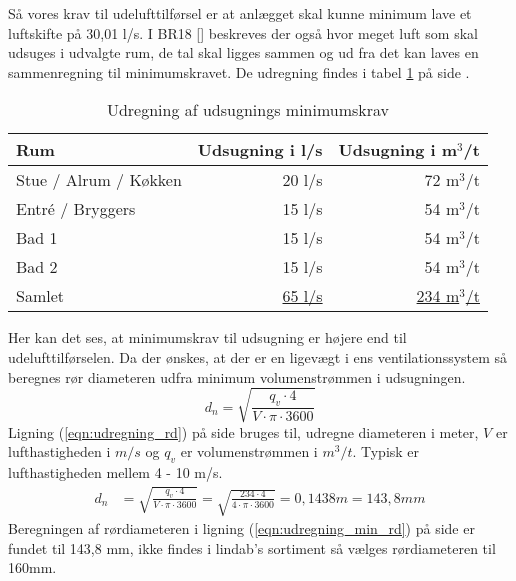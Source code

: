 Så vores krav til udelufttilførsel er at anlægget skal kunne minimum lave et luftskifte på 30,01 l/s.
I BR18 [\cite{BR18:Online}] beskreves der også hvor meget luft som skal udsuges i udvalgte rum, 
de tal skal ligges sammen og ud fra det kan laves en sammenregning til minimumskravet. De udregning findes i tabel \ref{table:samregn_vent_ud} på side \pageref{table:samregn_vent_ud}.
\begin{table}[h!]
    \begin{center}
       \begin{tabular}{|l|r|r|}
           \hline
           Rum & Udsugning i l/s & Udsugning i m$^3$/t \\
           \hline
           Stue / Alrum / Køkken & 20 l/s & 72 m$^3$/t\\
           Entré / Bryggers  & 15 l/s & 54 m$^3$/t\\
           Bad 1             & 15 l/s & 54 m$^3$/t\\
           Bad 2             & 15 l/s & 54 m$^3$/t\\
           \hline
           \hline
           Samlet & \underline{65 l/s} & \underline{234 m$^3$/t} \\
           \hline
       \end{tabular}
   \end{center}
   \caption{Udregning af udsugnings minimumskrav}
   \label{table:samregn_vent_ud}
\end{table}
Her kan det ses, at minimumskrav til udsugning er højere end til udelufttilførselen. 
Da der ønskes, at der er en ligevægt i ens ventilationssystem så beregnes rør diameteren udfra minimum volumenstrømmen i udsugningen.
\begin{equation}\label{eqn:udregning_rd}
d_{n} = \sqrt{ \frac{q_{v} \cdot 4}{V\cdot\pi\cdot3600}}
\end{equation}
Ligning (\ref{eqn:udregning_rd}) på side \pageref{eqn:udregning_rd} bruges til, udregne diameteren i meter, $V$ er lufthastigheden i $m/s$ og $q_v$ er volumenstrømmen i $m^{3}/t$.
Typisk er lufthastigheden mellem 4 - 10 m/s. 
\begin{align} \label{eqn:udregning_min_rd} 
    d_{n}       &= \sqrt{ \frac{q_{v} \cdot 4}{V\cdot\pi\cdot3600}} = \sqrt{ \frac{234 \cdot 4}{4\cdot\pi\cdot3600}} = 0,1438 m = 143,8 mm
\end{align}
Beregningen af rørdiameteren i ligning (\ref{eqn:udregning_min_rd}) på side \pageref{eqn:udregning_min_rd} er fundet til 143,8 mm, 
ikke findes i lindab's sortiment så vælges rørdiameteren til 160mm.

